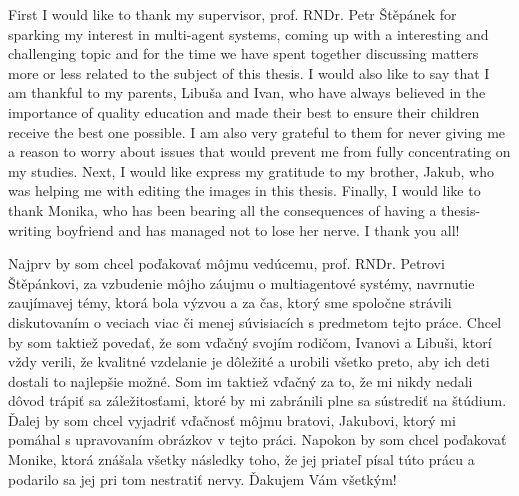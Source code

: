 
First I would like to thank my supervisor, prof. RNDr. Petr Štěpánek for sparking my interest in multi-agent systems, coming up with a interesting and challenging topic and for the time we have spent together discussing matters more or less related to the subject of this thesis.
I would also like to say that I am thankful to my parents, Libuša and Ivan, who have always believed in the importance of quality education and made their best to ensure their children receive the best one possible.
I am also very grateful to them for never giving me a reason to worry about issues that would prevent me from fully concentrating on my studies.
Next, I would like express my gratitude to my brother, Jakub, who was helping me with editing the images in this thesis.
Finally, I would like to thank Monika, who has been bearing all the consequences of having a thesis-writing boyfriend and has managed not to lose her nerve.
I thank you all!

\frenchspacing

Najprv by som chcel poďakovať môjmu vedúcemu, prof. RNDr. Petrovi Štěpánkovi, za vzbudenie môjho záujmu o multiagentové systémy, navrnutie zaujímavej témy, ktorá bola výzvou a za čas, ktorý sme spoločne strávili diskutovaním o veciach viac či menej súvisiacích s predmetom tejto práce.
Chcel by som taktiež povedať, že som vďačný svojím rodičom, Ivanovi a Libuši, ktorí vždy verili, že kvalitné vzdelanie je dôležité a urobili všetko preto, aby ich deti dostali to najlepšie možné.
Som im taktiež vďačný za to, že mi nikdy nedali dôvod trápiť sa záležitosťami, ktoré by mi zabránili plne sa sústrediť na štúdium.
Ďalej by som chcel vyjadriť vďačnosť môjmu bratovi, Jakubovi, ktorý mi pomáhal s upravovaním obrázkov v tejto práci.
Napokon by som chcel poďakovať Monike, ktorá znášala všetky následky toho, že jej priateľ písal túto prácu a podarilo sa jej pri tom nestratiť nervy.
Ďakujem Vám všetkým!

\nonfrenchspacing 